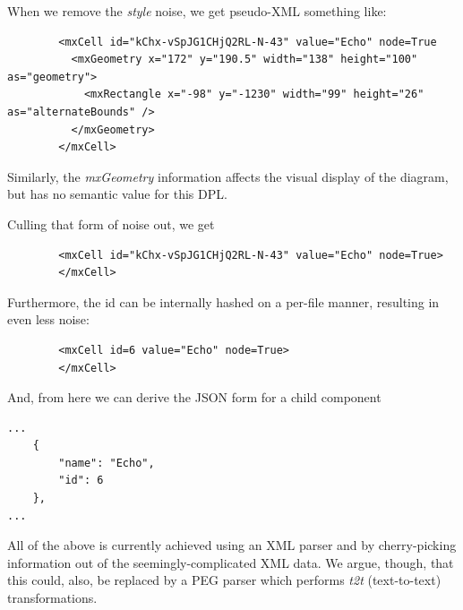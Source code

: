 \documentclass[10pt,anonymous,review]{acmart}
\begin{document}
When we remove the \emph{style} noise, we get pseudo-XML something like:
\begin{verbatim}
        <mxCell id="kChx-vSpJG1CHjQ2RL-N-43" value="Echo" node=True
          <mxGeometry x="172" y="190.5" width="138" height="100" as="geometry">
            <mxRectangle x="-98" y="-1230" width="99" height="26" as="alternateBounds" />
          </mxGeometry>
        </mxCell>
\end{verbatim}
Similarly, the \emph{mxGeometry} information affects the visual display of the diagram, but has no semantic value for this DPL.

Culling that form of noise out, we get
\begin{verbatim}
        <mxCell id="kChx-vSpJG1CHjQ2RL-N-43" value="Echo" node=True>
        </mxCell>
\end{verbatim}
Furthermore, the id can be internally hashed on a per-file manner, resulting in even less noise:
\begin{verbatim}
        <mxCell id=6 value="Echo" node=True>
        </mxCell>
\end{verbatim}
And, from here we can derive the JSON form for a child component
\begin{verbatim}
...
    {
        "name": "Echo",
        "id": 6
    },
...
\end{verbatim}
All of the above is currently achieved using an XML parser and by cherry-picking information out of
the seemingly-complicated XML data. We argue, though, that this could, also, be replaced
by a PEG parser which performs \emph{t2t} (text-to-text) transformations.
\end{document}
